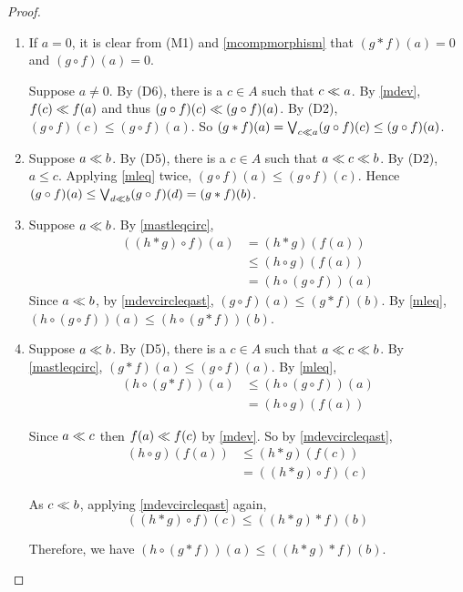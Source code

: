 \begin{proof}
	\leavevmode
	\begin{enumerate}		
		\item
			If \( a = 0 \), it is clear from (M1) and \ref{mcompmorphism} that \( (g \ast f)(a) = 0 \) and \( (g \circ f)(a) = 0 \).
			
			Suppose \( a \neq 0 \).  By (D6), there is a \( c \in A \) such that \( c \ll a \).  By \ref{mdev}, \( f(c) \ll f(a) \) and thus \( (g \circ f)(c) \ll (g \circ f)(a) \).  By (D2), \( (g \circ f)(c) \leq (g \circ f)(a) \).  So \( (g \ast f)(a) = \bigvee_{c \ll a} (g \circ f)(c) \leq (g \circ f)(a)  \).
			
		\item
			Suppose \( a \ll b \).  By (D5), there is a \( c \in A \) such that \( a \ll c \ll b \).  By (D2), \( a \leq c \).  Applying \ref{mleq} twice, \( (g \circ f)(a) \leq (g \circ f)(c) \).  Hence \( (g \circ f)(a) \leq \bigvee_{d \ll b} (g \circ f)(d) = (g \ast f)(b) \).
			
		\item
			Suppose \( a \ll b \).  By \ref{mastleqcirc},
			\begin{align*}
				((h \ast g) \circ f)(a) &= (h \ast g)(f(a)) \\
				&\leq (h \circ g)(f(a)) \\
				&= (h \circ (g \circ f))(a)
			\end{align*}
			Since \( a \ll b \), by \ref{mdevcircleqast}, \( (g \circ f)(a) \leq (g \ast f)(b) \).  By \ref{mleq}, \( (h \circ (g \circ f))(a) \leq (h \circ (g \ast f))(b) \).
		\item
			Suppose \( a \ll b \).  By (D5), there is a \( c \in A \) such that \( a \ll c \ll b \).  By \ref{mastleqcirc}, \( (g \ast f)(a) \leq (g \circ f)(a) \).  By \ref{mleq},
			\begin{align*}
				(h \circ (g \ast f))(a) &\leq (h \circ (g \circ f))(a) \\
				&= (h \circ g)(f(a))
			\end{align*}	
			
			Since \( a \ll c \) then \( f(a) \ll f(c) \) by \ref{mdev}.  So by \ref{mdevcircleqast},
			\begin{align*}
				(h \circ g)(f(a)) &\leq (h \ast g)(f(c)) \\
				&= ((h \ast g) \circ f)(c)
			\end{align*}
			
			As \( c \ll b \), applying \ref{mdevcircleqast} again,
			\[ ((h \ast g) \circ f)(c) \leq ((h \ast g) \ast f)(b) \]
			
			Therefore, we have \( (h \circ (g \ast f))(a) \leq ((h \ast g) \ast f)(b) \).
	\end{enumerate}
\end{proof}

